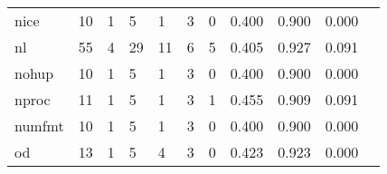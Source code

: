 \begin{longtable}{lp{1.20cm}p{1.20cm}p{1.20cm}p{1.20cm}p{1.20cm}p{1.20cm}p{1.20cm}p{1.20cm}p{1.20cm}p{1.20cm}}
nice      &                                    10 &                                                  1 &                                                  5 &                                                  1 &                                                  3 &                                                  0 &                                         0.400 &                                              0.900 &                                              0.000 \\
nl        &                                    55 &                                                  4 &                                                 29 &                                                 11 &                                                  6 &                                                  5 &                                         0.405 &                                              0.927 &                                              0.091 \\
nohup     &                                    10 &                                                  1 &                                                  5 &                                                  1 &                                                  3 &                                                  0 &                                         0.400 &                                              0.900 &                                              0.000 \\
nproc     &                                    11 &                                                  1 &                                                  5 &                                                  1 &                                                  3 &                                                  1 &                                         0.455 &                                              0.909 &                                              0.091 \\
numfmt    &                                    10 &                                                  1 &                                                  5 &                                                  1 &                                                  3 &                                                  0 &                                         0.400 &                                              0.900 &                                              0.000 \\
od        &                                    13 &                                                  1 &                                                  5 &                                                  4 &                                                  3 &                                                  0 &                                         0.423 &                                              0.923 &                                              0.000 \\

\end{longtable}
